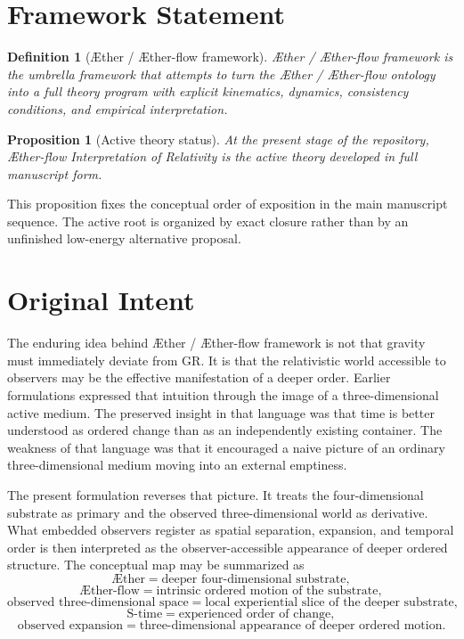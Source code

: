 \documentclass[11pt]{article}
\newcommand{\Aether}{\AE{}ther}
\newcommand{\Aflow}{\AE{}ther-flow}
\newcommand{\TheoryName}{\Aflow{} Interpretation of Relativity}
\newcommand{\TheoryProgram}{\Aether{} / \Aflow{} framework}
\newtheorem{definition}{Definition}
\newtheorem{proposition}{Proposition}
\begin{document}
\section{Framework Statement}

\begin{definition}[\TheoryProgram{}]
\TheoryProgram{} is the umbrella framework that attempts to turn the \Aether{} / \Aflow{} ontology into a full theory program with explicit kinematics, dynamics, consistency conditions, and empirical interpretation.
\end{definition}

\begin{proposition}[Active theory status]
At the present stage of the repository, \TheoryName{} is the active theory developed in full manuscript form.
\end{proposition}

This proposition fixes the conceptual order of exposition in the main manuscript sequence. The active root is organized by exact closure rather than by an unfinished low-energy alternative proposal.

\section{Original Intent}

The enduring idea behind \TheoryProgram{} is not that gravity must immediately deviate from GR. It is that the relativistic world accessible to observers may be the effective manifestation of a deeper order. Earlier formulations expressed that intuition through the image of a three-dimensional active medium. The preserved insight in that language was that time is better understood as ordered change than as an independently existing container. The weakness of that language was that it encouraged a naive picture of an ordinary three-dimensional medium moving into an external emptiness.

The present formulation reverses that picture. It treats the four-dimensional substrate as primary and the observed three-dimensional world as derivative. What embedded observers register as spatial separation, expansion, and temporal order is then interpreted as the observer-accessible appearance of deeper ordered structure. The conceptual map may be summarized as
\[
\text{\Aether{}}
=
\text{deeper four-dimensional substrate},
\]
\[
\text{\Aflow{}}
=
\text{intrinsic ordered motion of the substrate},
\]
\[
\text{observed three-dimensional space}
=
\text{local experiential slice of the deeper substrate},
\]
\[
\text{S-time}
=
\text{experienced order of change},
\]
\[
\text{observed expansion}
=
\text{three-dimensional appearance of deeper ordered motion}.
\]
\end{document}
